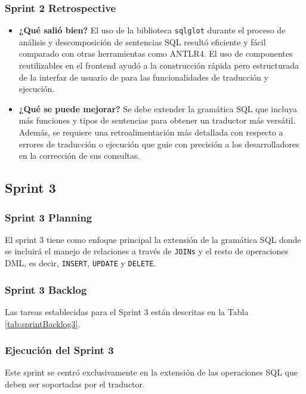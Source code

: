 \subsubsection{Sprint 2 Retrospective}
\begin{itemize}
    \item \textbf{¿Qué salió bien?} \newline
    El uso de la biblioteca \texttt{sqlglot} durante el proceso de análisis y descomposición de sentencias SQL resultó eficiente y fácil comparado con otras herramientas como ANTLR4. El uso de componentes reutilizables en el frontend ayudó a la construcción rápida pero estructurada de la interfaz de usuario de para las funcionalidades de traducción y ejecución.
    
    \item \textbf{¿Qué se puede mejorar?} \newline
    Se debe extender la gramática SQL que incluya más funciones y tipos de sentencias para obtener un traductor más versátil. Además, se requiere una retroalimentación más detallada con respecto a errores de traducción o ejecución que guie con precisión a los desarrolladores en la corrección de sus consultas.
    
\end{itemize}


\subsection{Sprint 3}
\subsubsection{Sprint 3 Planning}
El sprint 3 tiene como enfoque principal la extensión de la gramática SQL donde se incluirá el manejo de relaciones a través de \texttt{JOINs} y el resto de operaciones DML, es decir, \texttt{INSERT}, \texttt{UPDATE} y \texttt{DELETE}.

\subsubsection{Sprint 3 Backlog}
Las tareas establecidas para el Sprint 3 están descritas en la Tabla \ref{tab:sprintBacklog3}.




\subsubsection{Ejecución del Sprint 3}
Este sprint se centró exclusivamente en la extensión de las operaciones SQL que deben ser soportadas por el traductor.

